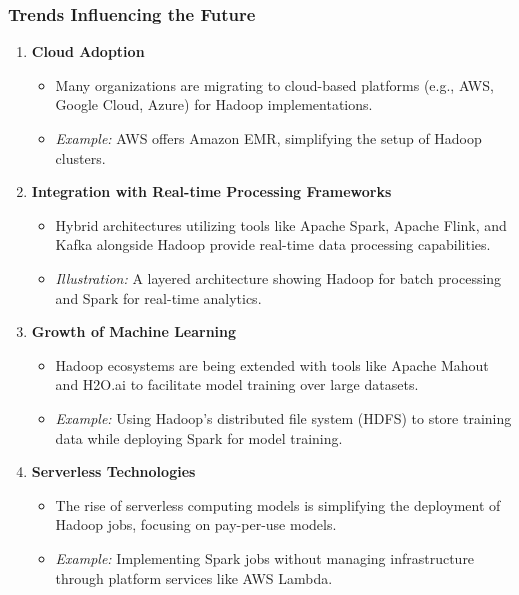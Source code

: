 \documentclass[aspectratio=169]{beamer}
\begin{document}
\begin{frame}[fragile]
    \frametitle{Trends Influencing the Future}
    \begin{enumerate}
        \item \textbf{Cloud Adoption}
        \begin{itemize}
            \item Many organizations are migrating to cloud-based platforms (e.g., AWS, Google Cloud, Azure) for Hadoop implementations.
            \item \textit{Example:} AWS offers Amazon EMR, simplifying the setup of Hadoop clusters.
        \end{itemize}

        \item \textbf{Integration with Real-time Processing Frameworks}
        \begin{itemize}
            \item Hybrid architectures utilizing tools like Apache Spark, Apache Flink, and Kafka alongside Hadoop provide real-time data processing capabilities.
            \item \textit{Illustration:} A layered architecture showing Hadoop for batch processing and Spark for real-time analytics.
        \end{itemize}

        \item \textbf{Growth of Machine Learning}
        \begin{itemize}
            \item Hadoop ecosystems are being extended with tools like Apache Mahout and H2O.ai to facilitate model training over large datasets.
            \item \textit{Example:} Using Hadoop's distributed file system (HDFS) to store training data while deploying Spark for model training.
        \end{itemize}

        \item \textbf{Serverless Technologies}
        \begin{itemize}
            \item The rise of serverless computing models is simplifying the deployment of Hadoop jobs, focusing on pay-per-use models.
            \item \textit{Example:} Implementing Spark jobs without managing infrastructure through platform services like AWS Lambda.
        \end{itemize}
    \end{enumerate}
\end{frame}
\end{document}
